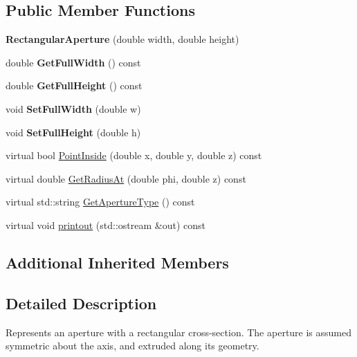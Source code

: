 \subsection*{Public Member Functions}
\begin{DoxyCompactItemize}
\item 
\mbox{\label{classRectangularAperture_a72667ca4e6c0f26892912e429a26f21a}} 
{\bfseries Rectangular\+Aperture} (double width, double height)
\item 
\mbox{\label{classRectangularAperture_afb6cead5d5d6247f3e9dda4e73fee28b}} 
double {\bfseries Get\+Full\+Width} () const
\item 
\mbox{\label{classRectangularAperture_a41ec2c085bca26497e15966da396debf}} 
double {\bfseries Get\+Full\+Height} () const
\item 
\mbox{\label{classRectangularAperture_a50f8945392fd7da7815bc883419f657a}} 
void {\bfseries Set\+Full\+Width} (double w)
\item 
\mbox{\label{classRectangularAperture_ab5b5ae4f0e7ba861e94665afd1f18c6d}} 
void {\bfseries Set\+Full\+Height} (double h)
\item 
virtual bool \hyperlink{classRectangularAperture_a47e965df14eb63f2a3851ea0e9fe26db}{Point\+Inside} (double x, double y, double z) const
\item 
virtual double \hyperlink{classRectangularAperture_a7ef1ddd66a755305b7bab2a2c3ac5d58}{Get\+Radius\+At} (double phi, double z) const
\item 
virtual std\+::string \hyperlink{classRectangularAperture_ac7d8e273423b18e1898286a51e3f22c7}{Get\+Aperture\+Type} () const
\item 
virtual void \hyperlink{classRectangularAperture_ab3a9514337b3fd3f2368f03ab6410533}{printout} (std\+::ostream \&out) const
\end{DoxyCompactItemize}
\subsection*{Additional Inherited Members}


\subsection{Detailed Description}
Represents an aperture with a rectangular cross-\/section. The aperture is assumed symmetric about the axis, and extruded along its geometry. 

